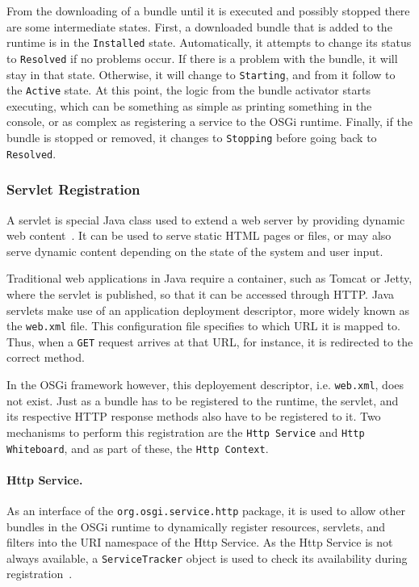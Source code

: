\documentclass[12pt]{article}
\begin{document}
From the downloading of a bundle until it is executed and possibly stopped there are some intermediate states. First, a downloaded bundle that is added to the runtime is in the \texttt{Installed} state. Automatically, it attempts to change its status to \texttt{Resolved} if no problems occur. If there is a problem with the bundle, it will stay in that state. Otherwise, it will change to \texttt{Starting}, and from it follow to the \texttt{Active} state. At this point, the logic from the bundle activator starts executing, which can be something as simple as printing something in the console, or as complex as registering a service to the OSGi runtime. Finally, if the bundle is stopped or removed, it changes to \texttt{Stopping} before going back to \texttt{Resolved}.

\subsubsection{Servlet Registration}

A servlet is special Java class used to extend a web server by providing dynamic web content~\cite{servlet}. It can be used to serve static HTML pages or files, or may also serve dynamic content depending on the state of the system and user input.

Traditional web applications in Java require a container, such as Tomcat or Jetty, where the servlet is published, so that it can be accessed through HTTP. Java servlets make use of an application deployment descriptor, more widely known as the \texttt{web.xml} file. This configuration file specifies to which URL it is mapped to. Thus, when a \texttt{GET} request arrives at that URL, for instance, it is redirected to the correct method.

In the OSGi framework however, this deployement descriptor, i.e. \texttt{web.xml}, does not exist. Just as a bundle has to be registered to the runtime, the servlet, and its respective HTTP response methods also have to be registered to it. Two mechanisms to perform this registration are the \texttt{Http Service} and \texttt{Http Whiteboard}, and as part of these, the \texttt{Http Context}.

\paragraph{Http Service.} As an interface of the \texttt{org.osgi.service.http} package, it is used to allow other bundles in the OSGi runtime to dynamically register resources, servlets, and filters into the URI namespace of the Http Service. As the Http Service is not always available, a \texttt{ServiceTracker} object is used to check its availability during registration~\cite{httpservice}.
\end{document}

